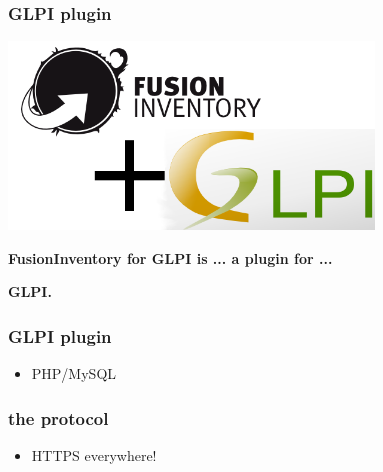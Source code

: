 %
\begin{frame}
    \frametitle{GLPI plugin}

    \includegraphics[height=5cm]{./pics/fusinvglpi.png}

    \bf{FusionInventory for GLPI} is ... a plugin for ...

    \bf{GLPI}.
\end{frame}

\begin{frame}
    \frametitle{GLPI plugin}

    \begin{itemize}
        \item PHP/MySQL
    \end{itemize}
\end{frame}

\begin{frame}
    \frametitle{the protocol}

    \begin{itemize}
        \item HTTPS everywhere! 
    \end{itemize}
\end{frame}



